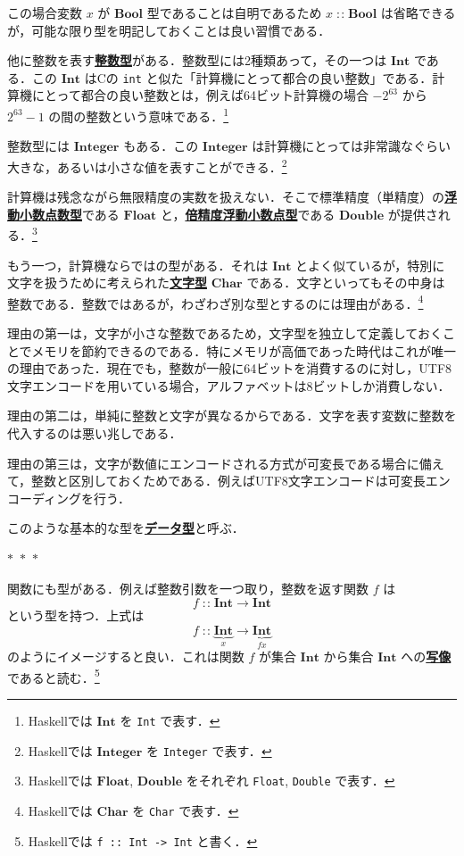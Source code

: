 \documentclass[a5paper,twoside,fleqn,draft]{jsbook}
\newcommand{\separator}{\begin{center}$*$~$*$~$*$\end{center}}
\newcommand{\programminglanguage}[1]{\textsf{#1}}
\newcommand{\clang}{\programminglanguage{C}}
\newcommand{\haskell}{\programminglanguage{Haskell}}
\newcommand{\keyword}[1]{{\underline{\textbf{#1}}}}
\newcommand{\code}[1]{\texttt{#1}}
\DeclareMathOperator{\mFuncArrow}{\rightarrow}
\DeclareMathOperator{\mIn}{{:\!:}}
\newcommand{\mType}[1]{\mathbf{#1}} %
\newcommand{\mBoolType}{\mType{Bool}}
\newcommand{\mCharType}{\mType{Char}}
\newcommand{\mFloatType}{\mType{Float}}
\newcommand{\mDoubleType}{\mType{Double}}
\newcommand{\mIntType}{\mType{Int}}
\newcommand{\mIntegerType}{\mType{Integer}}
\begin{document}
この場合変数 $x$ が $\mBoolType$ 型であることは自明であるため $x\mIn\mBoolType$ は省略できるが，可能な限り型を明記しておくことは良い習慣である．

他に整数を表す\keyword{整数型}がある．整数型には2種類あって，その一つは $\mIntType$ である．この $\mIntType$ は\clang の \code{int} と似た「計算機にとって都合の良い整数」である．計算機にとって都合の良い整数とは，例えば64ビット計算機の場合 $-2^{63}$ から $2^{63}-1$ の間の整数という意味である．\footnote{\haskell では $\mIntType$ を \code{Int} で表す．}

整数型には $\mIntegerType$ もある．この $\mIntegerType$ は計算機にとっては非常識なぐらい大きな，あるいは小さな値を表すことができる．\footnote{\haskell では $\mIntegerType$ を \code{Integer} で表す．}

計算機は残念ながら無限精度の実数を扱えない．そこで標準精度（単精度）の\keyword{浮動小数点数型}である $\mFloatType$ と，\keyword{倍精度浮動小数点型}である $\mDoubleType$ が提供される．\footnote{\haskell では $\mFloatType$, $\mDoubleType$ をそれぞれ \code{Float}, \code{Double} で表す．}

もう一つ，計算機ならではの型がある．それは $\mIntType$ とよく似ているが，特別に文字を扱うために考えられた\keyword{文字型} $\mCharType$ である．文字といってもその中身は整数である．整数ではあるが，わざわざ別な型とするのには理由がある．\footnote{\haskell では $\mCharType$ を \code{Char} で表す．}

理由の第一は，文字が小さな整数であるため，文字型を独立して定義しておくことでメモリを節約できるのである．特にメモリが高価であった時代はこれが唯一の理由であった．現在でも，整数が一般に64ビットを消費するのに対し，UTF8文字エンコードを用いている場合，アルファベットは8ビットしか消費しない．

理由の第二は，単純に整数と文字が異なるからである．文字を表す変数に整数を代入するのは悪い兆しである．

理由の第三は，文字が数値にエンコードされる方式が可変長である場合に備えて，整数と区別しておくためである．例えばUTF8文字エンコードは可変長エンコーディングを行う．

このような基本的な型を\keyword{データ型}と呼ぶ．

\separator

関数にも型がある．例えば整数引数を一つ取り，整数を返す関数 $f$ は
\begin{equation}
  f
  \mIn\mIntType
  \mFuncArrow\mIntType
\end{equation}
という型を持つ．上式は
\begin{equation}
  f
  \mIn\underbrace{\mIntType}_{x}
  \mFuncArrow\underbrace{\mIntType}_{fx}
\end{equation}
のようにイメージすると良い．これは関数 $f$ が集合 $\mIntType$ から集合 $\mIntType$ への\keyword{写像}であると読む．\footnote{\haskell では \code{f :: Int -> Int} と書く．}
\end{document}
